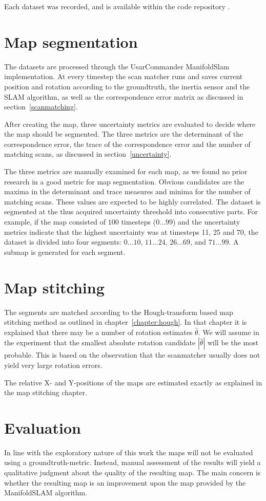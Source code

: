 Each dataset was recorded, and is available within the code repository \cite{github}.

\section{Map segmentation}
The datasets are processed through the UsarCommander ManifoldSlam implementation. At every timestep the scan matcher runs and saves current position and rotation according to the groundtruth, the inertia sensor and the SLAM algorithm, as well as the correspondence error matrix as discussed in section~\ref{scanmatching}.

After creating the map, three uncertainty metrics are evaluated to decide where the map should be segmented. The three metrics are the determinant of the correspondence error, the trace of the correspondence error and the number of matching scans, as discussed in section~\ref{uncertainty}.

The three metrics are manually examined for each map, as we found no prior research in a good metric for map segmentation. Obvious candidates are the maxima in the determinant and trace measures and minima for the number of matching scans. These values are expected to be highly correlated. The dataset is segmented at the thus acquired uncertainty threshold into consecutive parts. For example, if the map consisted of $100$ timesteps ($0 \ldots 99$) and the uncertainty metrics indicate that the highest uncertainty was at timesteps 11, 25 and 70, the dataset is divided into four segments: $0 \ldots 10$, $11 \ldots 24$, $26 \ldots 69$, and $71 \ldots 99$. A submap is generated for each segment.

\section{Map stitching}
The segments are matched according to the Hough-transform based map stitching method as outlined in chapter~\ref{chapter:hough}. In that chapter it is explained that there may be a number of rotation estimates $\hat \theta$. We will assume in the experiment that the smallest absolute rotation candidate $|\hat \theta|$ will be the most probable. This is based on the observation that the scanmatcher usually does not yield very large rotation errors.

The relative X- and Y-positions of the maps are estimated exactly as explained in the map stitching chapter.

\section{Evaluation}
In line with the exploratory nature of this work the maps will not be evaluated using a groundtruth-metric. Instead, manual assessment of the results will yield a qualitative judgment about the quality of the resulting map. The main concern is whether the resulting map is an improvement upon the map provided by the ManifoldSLAM algorithm.